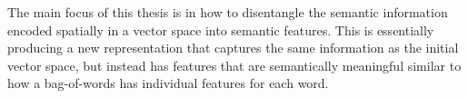 The main focus of this thesis is in how to disentangle the semantic information encoded spatially in a vector space into semantic features. This is essentially producing a new representation that captures the same information as the initial vector space, but instead has features that are semantically meaningful similar to how a bag-of-words has individual features for each word.  






















